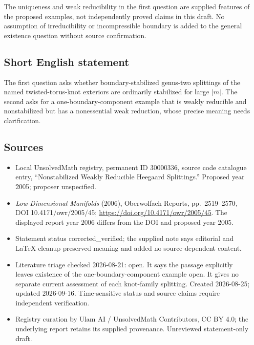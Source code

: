 \documentclass[11pt]{article}
\begin{document}
The uniqueness and weak reducibility in the first question are supplied features of the proposed examples, not independently proved claims in this draft. No assumption of irreducibility or incompressible boundary is added to the general existence question without source confirmation.
\subsection{Short English statement}
The first question asks whether boundary-stabilized genus-two splittings of the named twisted-torus-knot exteriors are ordinarily stabilized for large $|m|$. The second asks for a one-boundary-component example that is weakly reducible and nonstabilized but has a nonessential weak reduction, whose precise meaning needs clarification.
\subsection{Sources}
\begin{itemize}
\item Local UnsolvedMath registry, permanent ID 30000336, source code catalogue entry, ``Nonstabilized Weakly Reducible Heegaard Splittings.'' Proposed year 2005; proposer unspecified.
\item \emph{Low-Dimensional Manifolds} (2006), Oberwolfach Reports, pp.\ 2519--2570, DOI 10.4171/owr/2005/45; \url{https://doi.org/10.4171/owr/2005/45}. The displayed report year 2006 differs from the DOI and proposed year 2005.
\item Statement status corrected\_verified; the supplied note says editorial and LaTeX cleanup preserved meaning and added no source-dependent content.
\item Literature triage checked 2026-08-21: open. It says the passage explicitly leaves existence of the one-boundary-component example open. It gives no separate current assessment of each knot-family splitting. Created 2026-08-25; updated 2026-09-16. Time-sensitive status and source claims require independent verification.
\item Registry curation by Ulam AI / UnsolvedMath Contributors, CC BY 4.0; the underlying report retains its supplied provenance. Unreviewed statement-only draft.
\end{itemize}
\end{document}
